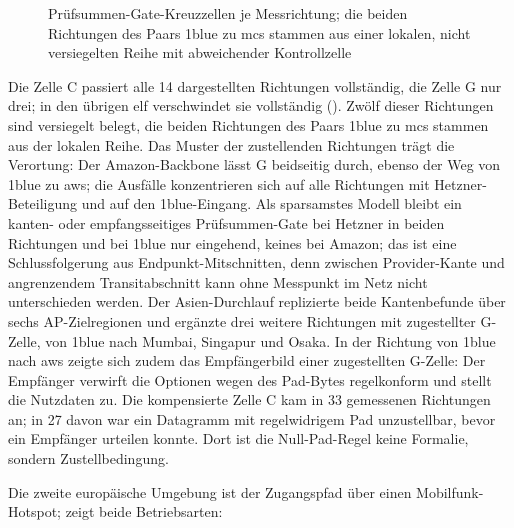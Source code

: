 \begin{figure}[H]
    \centering
    
    \caption[Prüfsummen-Gate-Kreuzzellen je Messrichtung]{Prüfsummen-Gate-Kreuzzellen je Messrichtung;
      die beiden Richtungen des Paars 1blue zu mcs
        stammen aus einer lokalen, nicht versiegelten Reihe mit abweichender Kontrollzelle}
    \label{fig:eval-gate}
\end{figure}

Die Zelle C passiert alle 14 dargestellten Richtungen vollständig, die Zelle G nur drei; in den übrigen elf verschwindet
sie vollständig (). Zwölf dieser Richtungen sind versiegelt belegt, die beiden Richtungen des
Paars 1blue zu mcs stammen aus der lokalen Reihe. Das Muster der zustellenden Richtungen trägt die Verortung: Der
Amazon-Backbone lässt G beidseitig durch, ebenso der Weg von 1blue zu aws; die Ausfälle konzentrieren sich auf alle
Richtungen mit Hetzner-Beteiligung und auf den 1blue-Eingang. Als sparsamstes Modell bleibt ein kanten- oder
empfangsseitiges Prüfsummen-Gate bei Hetzner in beiden Richtungen und bei 1blue nur eingehend, keines bei Amazon; das
ist eine Schlussfolgerung aus Endpunkt-Mitschnitten, denn zwischen Provider-Kante und angrenzendem Transitabschnitt kann
ohne Messpunkt im Netz nicht unterschieden werden. Der Asien-Durchlauf replizierte beide Kantenbefunde über sechs
AP-Zielregionen und ergänzte drei weitere Richtungen mit zugestellter G-Zelle, von 1blue nach Mumbai, Singapur und
Osaka. In der Richtung von 1blue nach aws zeigte sich zudem das Empfängerbild einer zugestellten G-Zelle: Der
Empfänger verwirft die Optionen wegen des Pad-Bytes regel\-konform und stellt die Nutzdaten zu. Die kompensierte Zelle C
kam in 33 gemessenen Richtungen an; in 27 davon war ein Datagramm mit regelwidrigem Pad unzustellbar, bevor ein
Empfänger urteilen konnte. Dort ist die Null-Pad-Regel keine Formalie, sondern Zustellbedingung.

Die zweite europäische Umgebung ist der Zugangspfad über einen Mobilfunk-Hotspot;
 zeigt beide Betriebsarten:

